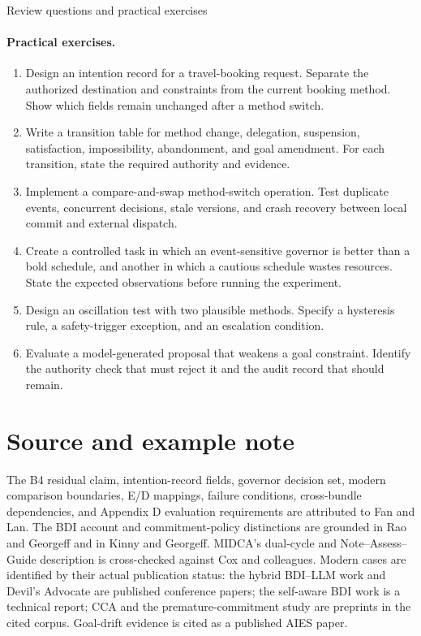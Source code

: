 \begin{reviewquestions}{Review questions and practical exercises}
\paragraph{Practical exercises.}
\begin{enumerate}
  \item Design an intention record for a travel-booking request. Separate the authorized destination and constraints from the current booking method. Show which fields remain unchanged after a method switch.
  \item Write a transition table for method change, delegation, suspension, satisfaction, impossibility, abandonment, and goal amendment. For each transition, state the required authority and evidence.
  \item Implement a compare-and-swap method-switch operation. Test duplicate events, concurrent decisions, stale versions, and crash recovery between local commit and external dispatch.
  \item Create a controlled task in which an event-sensitive governor is better than a bold schedule, and another in which a cautious schedule wastes resources. State the expected observations before running the experiment.
  \item Design an oscillation test with two plausible methods. Specify a hysteresis rule, a safety-trigger exception, and an escalation condition.
  \item Evaluate a model-generated proposal that weakens a goal constraint. Identify the authority check that must reject it and the audit record that should remain.
\end{enumerate}
\end{reviewquestions}

\section*{Source and example note}

The B4 residual claim, intention-record fields, governor decision set, modern comparison boundaries, E/D mappings, failure conditions, cross-bundle dependencies, and Appendix D evaluation requirements are attributed to Fan and Lan. The BDI account and commitment-policy distinctions are grounded in Rao and Georgeff and in Kinny and Georgeff. MIDCA's dual-cycle and Note--Assess--Guide description is cross-checked against Cox and colleagues. Modern cases are identified by their actual publication status: the hybrid BDI--LLM work and Devil's Advocate are published conference papers; the self-aware BDI work is a technical report; CCA and the premature-commitment study are preprints in the cited corpus. Goal-drift evidence is cited as a published AIES paper.

